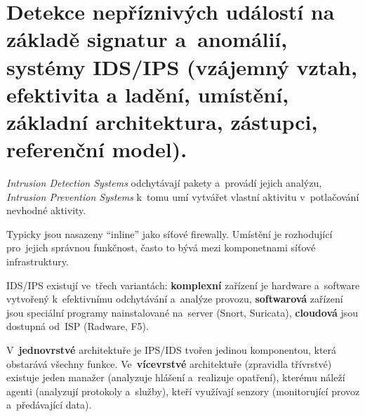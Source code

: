 \clearpage
\section{Detekce nepříznivých událostí na základě signatur a~anomálií, systémy IDS/IPS (vzájemný vztah, efektivita a ladění, umístění, základní architektura, zástupci, referenční model).}

\emph{Intrusion Detection Systems} odchytávají pakety a~provádí jejich analýzu, \emph{Intrusion Prevention Systems} k~tomu umí vytvářet vlastní aktivitu v~potlačování nevhodné aktivity.

Typicky jsou nasazeny \enquote{inline} jako síťové firewally. Umístění je rozhodující pro~jejich správnou funkčnost, často to bývá mezi komponetnami síťové infrastruktury.

\begin{figure}[ht]
\centering
{}
\end{figure}

IDS/IPS existují ve~třech variantách: \textbf{komplexní} zařízení je hardware a~software vytvořený k~efektivnímu odchytávání a~analýze provozu, \textbf{softwarová} zařízení jsou speciální programy nainstalované na~server (Snort, Suricata), \textbf{cloudová} jsou dostupná od~ISP (Radware, F5).

V~\textbf{jednovrstvé} architektuře je IPS/IDS tvořen jedinou komponentou, která obstarává všechny funkce. Ve~\textbf{vícevrstvé} architektuře (zpravidla třívrstvé) existuje jeden manažer (analyzuje hlášení a~realizuje opatření), kterému náleží agenti (analyzují protokoly a~služby), kteří využívají senzory (monitorující provoz a~předávající data).

